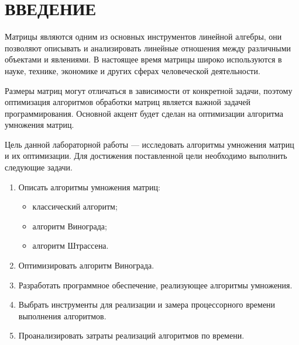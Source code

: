 \chapter*{ВВЕДЕНИЕ}

Матрицы являются одним из основных инструментов линейной алгебры, они позволяют описывать и анализировать линейные отношения между различными объектами и явлениями.
В настоящее время матрицы широко используются в науке, технике, экономике и других сферах человеческой деятельности.

Размеры матриц могут отличаться в зависимости от конкретной задачи, поэтому оптимизация алгоритмов обработки матриц является важной задачей программирования.
Основной акцент будет сделан на оптимизации алгоритма умножения матриц.

Цель данной лабораторной работы --- исследовать алгоритмы умножения матриц и их оптимизации.
Для достижения поставленной цели необходимо выполнить следующие задачи.
\begin{enumerate}
	\item Описать алгоритмы умножения матриц: 
	\begin{itemize}
		\item классический алгоритм;
		\item алгоритм Винограда;
		\item алгоритм Штрассена.
	\end{itemize}
	\item Оптимизировать алгоритм Винограда.
	\item Разработать программное обеспечение, реализующее алгоритмы умножения.
	\item Выбрать инструменты для реализации и замера процессорного времени
	выполнения алгоритмов.
	\item Проанализировать затраты реализаций алгоритмов по времени.
\end{enumerate}


